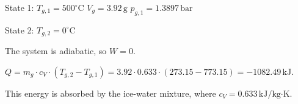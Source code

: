 State 1:  
\( T_{g,1} = 500^\circ \text{C} \)  
\( V_g = 3.92 \, \text{g} \)  
\( p_{g,1} = 1.3897 \, \text{bar} \)  

State 2:  
\( T_{g,2} = 0^\circ \text{C} \)  

The system is adiabatic, so \( W = 0 \).  

\( Q = m_g \cdot c_V \cdot (T_{g,2} - T_{g,1}) = 3.92 \cdot 0.633 \cdot (273.15 - 773.15) = -1082.49 \, \text{kJ} \).  

This energy is absorbed by the ice-water mixture, where \( c_V = 0.633 \, \text{kJ/kg·K} \).
